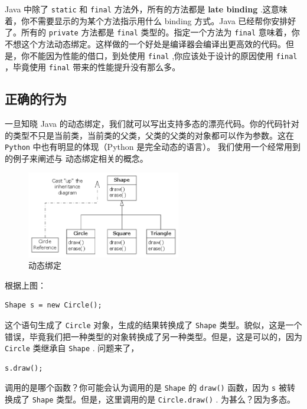 \documentclass[10pt,a4paper,UTF8]{article}
\begin{document}
Java 中除了 \texttt{static} 和 \texttt{final} 方法外，所有的方法都是 \textbf{late binding} .这意味着，你不需要显示的为某个方法指示用什么 binding 方式。Java 已经帮你安排好了。所有的 \texttt{private} 方法都是 \texttt{final} 类型的。指定一个方法为 \texttt{final} 意味着，你不想这个方法动态绑定。这样做的一个好处是编译器会编译出更高效的代码。但是，你不能因为性能的借口，到处使用 \texttt{final} ,你应该处于设计的原因使用 \texttt{final} ，毕竟使用 \texttt{final} 带来的性能提升没有那么多。

\subsection{正确的行为}
\label{sec:org55291da}

一旦知晓 Java 的动态绑定，我们就可以写出支持多态的漂亮代码。你的代码针对的类型不只是当前类，当前类的父类，父类的父类的对象都可以作为参数。这在 \texttt{Python} 中也有明显的体现（Python 是完全动态的语言）。 我们使用一个经常用到的例子来阐述与 动态绑定相关的概念。
\begin{figure}[htbp]
\centering
\includegraphics[width=0.6\textwidth]{../../img/computer_TIJ/20170730shape.png}
\caption{\label{fig:org9a003fa}
动态绑定}
\end{figure}

根据上图：
\lstset{language=java,label= ,caption= ,captionpos=b,numbers=none}
\begin{lstlisting}
Shape s = new Circle();
\end{lstlisting}
这个语句生成了 \texttt{Circle} 对象，生成的结果转换成了 \texttt{Shape} 类型。貌似，这是一个错误，毕竟我们把一种类型的对象转换成了另一种类型。但是，这是可以的，因为 \texttt{Circle} 类继承自 \texttt{Shape} . 问题来了，
\lstset{language=java,label= ,caption= ,captionpos=b,numbers=none}
\begin{lstlisting}
s.draw();
\end{lstlisting}
调用的是哪个函数？你可能会认为调用的是 \texttt{Shape} 的 \texttt{draw()} 函数，因为 \texttt{s} 被转换成了 \texttt{Shape} 类型。但是，这里调用的是 \texttt{Circle.draw()} . 为甚么？因为多态。
\end{document}

